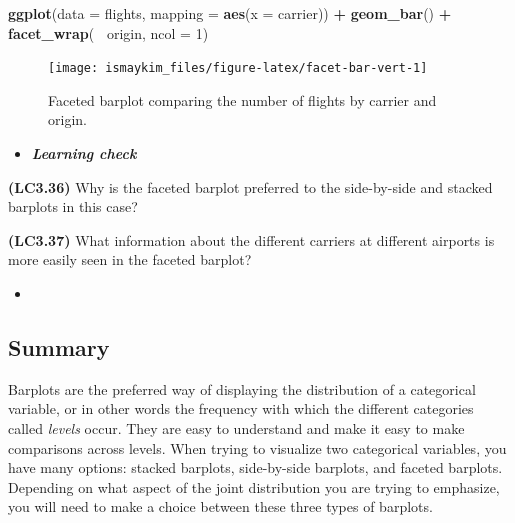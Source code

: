 \documentclass[12pt, krantz2,]{krantz}
\makeatletter
\newenvironment{Shaded}{\begin{snugshade}}{\end{snugshade}}
\newcommand{\DataTypeTok}[1]{\textcolor[rgb]{0.27,0.27,0.27}{#1}}
\newcommand{\DecValTok}[1]{\textcolor[rgb]{0.06,0.06,0.06}{#1}}
\newcommand{\KeywordTok}[1]{\textcolor[rgb]{0.27,0.27,0.27}{\textbf{#1}}}
\newcommand{\NormalTok}[1]{#1}
\newcommand{\OperatorTok}[1]{\textcolor[rgb]{0.43,0.43,0.43}{\textbf{#1}}}
\newcommand{\StringTok}[1]{\textcolor[rgb]{0.5,0.5,0.5}{#1}}
\newenvironment{kframe}{%
\medskip{}
\setlength{\fboxsep}{.8em}
 \def\at@end@of@kframe{}%
 \ifinner\ifhmode%
  \def\at@end@of@kframe{\end{minipage}}%
  \begin{minipage}{\columnwidth}%
 \fi\fi%
 \def\FrameCommand##1{\hskip\@totalleftmargin \hskip-\fboxsep
 \colorbox{shadecolor}{##1}\hskip-\fboxsep
     \hskip-\linewidth \hskip-\@totalleftmargin \hskip\columnwidth}%
 \MakeFramed {\advance\hsize-\width
   \@totalleftmargin\z@ \linewidth\hsize
   \@setminipage}}%
 {\par\unskip\endMakeFramed%
 \at@end@of@kframe}
\renewenvironment{Shaded}{\begin{kframe}}{\end{kframe}}
\newenvironment{rmdblock}[1]
  {\begin{shaded*}
  \begin{itemize}
  \renewcommand{\labelitemi}{
    \raisebox{-.7\height}[0pt][0pt]{
    }
  }
  \item
  }
  {
  \end{itemize}
  \end{shaded*}
  }
\newenvironment{learncheck}
  {\begin{rmdblock}{warning}}
  {\end{rmdblock}}
\makeatother
\begin{document}
\begin{Shaded}
\begin{Highlighting}[]
\KeywordTok{ggplot}\NormalTok{(}\DataTypeTok{data =}\NormalTok{ flights, }\DataTypeTok{mapping =} \KeywordTok{aes}\NormalTok{(}\DataTypeTok{x =}\NormalTok{ carrier)) }\OperatorTok{+}
\StringTok{  }\KeywordTok{geom_bar}\NormalTok{() }\OperatorTok{+}
\StringTok{  }\KeywordTok{facet_wrap}\NormalTok{(}\OperatorTok{~}\StringTok{ }\NormalTok{origin, }\DataTypeTok{ncol =} \DecValTok{1}\NormalTok{)}
\end{Highlighting}
\end{Shaded}

\begin{figure}

{\centering \texttt{[image: ismaykim\_files/figure-latex/facet-bar-vert-1]} 

}

\caption{Faceted barplot comparing the number of flights by carrier and origin.}\label{fig:facet-bar-vert}
\end{figure}

\begin{learncheck}
\textbf{\emph{Learning check}}
\end{learncheck}

\textbf{(LC3.36)} Why is the faceted barplot preferred to the side-by-side and stacked barplots in this case?

\textbf{(LC3.37)} What information about the different carriers at different airports is more easily seen in the faceted barplot?

\begin{learncheck}

\end{learncheck}

\hypertarget{summary-4}{%
\subsection{Summary}\label{summary-4}}

Barplots are the preferred way of displaying the distribution of a categorical variable, or in other words the frequency with which the different categories called \emph{levels} occur. They are easy to understand and make it easy to make comparisons across levels. When trying to visualize two categorical variables, you have many options: stacked barplots, side-by-side barplots, and faceted barplots. Depending on what aspect of the joint distribution you are trying to emphasize, you will need to make a choice between these three types of barplots.
\end{document}
